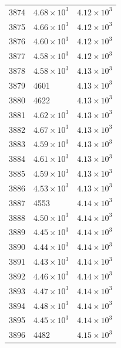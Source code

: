 \begin{table}[H]
\begin{tabular}{lll}
3874 & $\displaystyle 4.68 \times 10^{3}$ & $\displaystyle 4.12 \times 10^{3}$ \\
3875 & $\displaystyle 4.66 \times 10^{3}$ & $\displaystyle 4.12 \times 10^{3}$ \\
3876 & $\displaystyle 4.60 \times 10^{3}$ & $\displaystyle 4.12 \times 10^{3}$ \\
3877 & $\displaystyle 4.58 \times 10^{3}$ & $\displaystyle 4.12 \times 10^{3}$ \\
3878 & $\displaystyle 4.58 \times 10^{3}$ & $\displaystyle 4.13 \times 10^{3}$ \\
3879 & 4601 & $\displaystyle 4.13 \times 10^{3}$ \\
3880 & 4622 & $\displaystyle 4.13 \times 10^{3}$ \\
3881 & $\displaystyle 4.62 \times 10^{3}$ & $\displaystyle 4.13 \times 10^{3}$ \\
3882 & $\displaystyle 4.67 \times 10^{3}$ & $\displaystyle 4.13 \times 10^{3}$ \\
3883 & $\displaystyle 4.59 \times 10^{3}$ & $\displaystyle 4.13 \times 10^{3}$ \\
3884 & $\displaystyle 4.61 \times 10^{3}$ & $\displaystyle 4.13 \times 10^{3}$ \\
3885 & $\displaystyle 4.59 \times 10^{3}$ & $\displaystyle 4.13 \times 10^{3}$ \\
3886 & $\displaystyle 4.53 \times 10^{3}$ & $\displaystyle 4.13 \times 10^{3}$ \\
3887 & 4553 & $\displaystyle 4.14 \times 10^{3}$ \\
3888 & $\displaystyle 4.50 \times 10^{3}$ & $\displaystyle 4.14 \times 10^{3}$ \\
3889 & $\displaystyle 4.45 \times 10^{3}$ & $\displaystyle 4.14 \times 10^{3}$ \\
3890 & $\displaystyle 4.44 \times 10^{3}$ & $\displaystyle 4.14 \times 10^{3}$ \\
3891 & $\displaystyle 4.43 \times 10^{3}$ & $\displaystyle 4.14 \times 10^{3}$ \\
3892 & $\displaystyle 4.46 \times 10^{3}$ & $\displaystyle 4.14 \times 10^{3}$ \\
3893 & $\displaystyle 4.47 \times 10^{3}$ & $\displaystyle 4.14 \times 10^{3}$ \\
3894 & $\displaystyle 4.48 \times 10^{3}$ & $\displaystyle 4.14 \times 10^{3}$ \\
3895 & $\displaystyle 4.45 \times 10^{3}$ & $\displaystyle 4.14 \times 10^{3}$ \\
3896 & 4482 & $\displaystyle 4.15 \times 10^{3}$ \\

\end{tabular}
\end{table}
